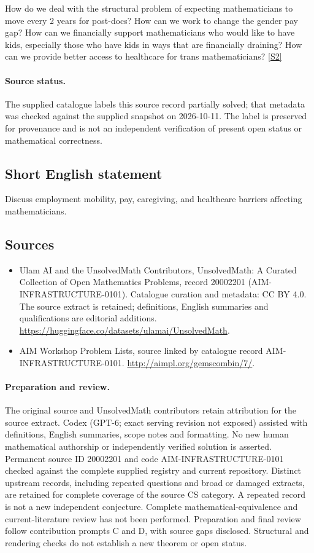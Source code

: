 \documentclass[11pt]{article}
\newcommand{\sref}[2]{\hyperlink{source:#1:#2}{[S#2]}}
\begin{document}
How do we deal with the structural problem of expecting mathematicians to move every 2 years for post-docs? How can we work to change the gender pay gap? How can we financially support mathematicians who would like to have kids, especially those who have kids in ways that are financially draining? How can we provide better access to healthcare for trans mathematicians? \sref{20002201}{2}
\paragraph{Source status.}
The supplied catalogue labels this source record partially solved; that metadata was checked against the supplied snapshot on 2026-10-11. The label is preserved for provenance and is not an independent verification of present open status or mathematical correctness.
\subsection{Short English statement}
Discuss employment mobility, pay, caregiving, and healthcare barriers affecting mathematicians.
\subsection{Sources}
\begin{itemize}
\item[\hypertarget{source:20002201:1}{S1}] Ulam AI and the UnsolvedMath Contributors, UnsolvedMath: A Curated Collection of Open Mathematics Problems, record 20002201 (AIM-INFRASTRUCTURE-0101). Catalogue curation and metadata: CC BY 4.0. The source extract is retained; definitions, English summaries and qualifications are editorial additions.
\url{https://huggingface.co/datasets/ulamai/UnsolvedMath}.
\item[\hypertarget{source:20002201:2}{S2}] AIM Workshop Problem Lists, source linked by catalogue record AIM-INFRASTRUCTURE-0101.
\url{http://aimpl.org/gemscombin/7/}.
\end{itemize}
\paragraph{Preparation and review.}
The original source and UnsolvedMath contributors retain attribution for the source extract. Codex (GPT-6; exact serving revision not exposed) assisted with definitions, English summaries, scope notes and formatting. No new human mathematical authorship or independently verified solution is asserted. Permanent source ID 20002201 and code AIM-INFRASTRUCTURE-0101 checked against the complete supplied registry and current repository. Distinct upstream records, including repeated questions and broad or damaged extracts, are retained for complete coverage of the source CS category. A repeated record is not a new independent conjecture. Complete mathematical-equivalence and current-literature review has not been performed. Preparation and final review follow contribution prompts C and D, with source gaps disclosed. Structural and rendering checks do not establish a new theorem or open status.
\label{end:20002201}
\end{document}
